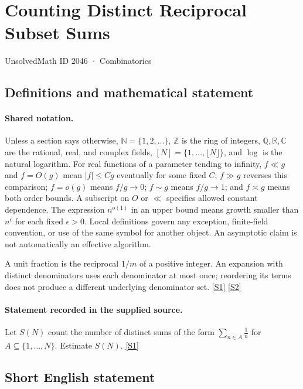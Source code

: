 \documentclass[11pt,a4paper]{article}
\newcommand{\N}{\mathbb{N}}
\newcommand{\Z}{\mathbb{Z}}
\newcommand{\Q}{\mathbb{Q}}
\newcommand{\R}{\mathbb{R}}
\newcommand{\C}{\mathbb{C}}
\newcommand{\sref}[2]{\hyperlink{source:#1:#2}{[S#2]}}
\begin{document}

\setcounter{section}{2045}

\section{Counting Distinct Reciprocal Subset Sums}\label{2046}

{\small\sffamily UnsolvedMath ID 2046 · Combinatorics}

\subsection{Definitions and mathematical statement}

\paragraph{Shared notation.}Unless a section says otherwise, $\N=\{1,2,\ldots\}$,
$\Z$ is the ring of integers, $\Q,\R,\C$ are the rational, real, and complex
fields, $[N]=\{1,\ldots,\lfloor N\rfloor\}$, and $\log$ is the natural
logarithm. For real functions of a parameter tending to infinity,
$f\ll g$ and $f=O(g)$ mean $|f|\leq Cg$ eventually for some fixed $C$;
$f\gg g$ reverses this comparison; $f=o(g)$ means $f/g\to0$;
$f\sim g$ means $f/g\to1$; and $f\asymp g$ means both order bounds.
A subscript on $O$ or $\ll$ specifies allowed constant dependence.
The expression $n^{o(1)}$ in an upper bound means growth smaller than
$n^\epsilon$ for each fixed $\epsilon>0$. Local definitions govern any
exception, finite-field convention, or use of the same symbol for another
object. An asymptotic claim is not automatically an effective algorithm.



A unit fraction is the reciprocal $1/m$ of a positive integer. An expansion with distinct denominators uses each denominator at most once; reordering its terms does not produce a different underlying denominator set. \sref{2046}{1} \sref{2046}{2}

\paragraph{Statement recorded in the supplied source.}
Let $S(N)$ count the number of distinct sums of the form $\sum_{n\in A}\frac{1}{n}$ for $A\subseteq \{1,\ldots,N\}$. Estimate $S(N)$. \sref{2046}{1}

\subsection{Short English statement}
\end{document}
